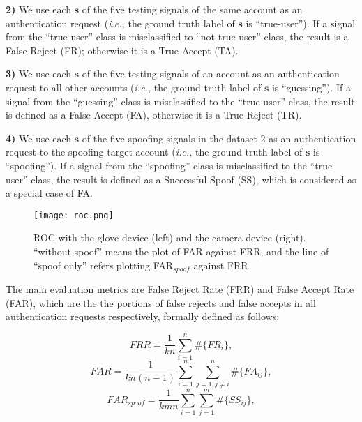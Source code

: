 \documentclass[conference]{IEEEtran}
\begin{document}
\textbf{2)} We use each $\mathbf{s}$ of the five testing signals of the same account as an authentication request (\textit{i.e.,} the ground truth label of $\mathbf{s}$ is ``true-user''). If a signal from the ``true-user'' class is misclassified to ``not-true-user'' class, the result is a False Reject (FR); otherwise it is a True Accept (TA). 

\textbf{3)} We use each $\mathbf{s}$ of the five testing signals of an account as an authentication request to all other accounts (\textit{i.e.,} the ground truth label of $\mathbf{s}$ is ``guessing''). If a signal from the ``guessing'' class is misclassified to the ``true-user'' class, the result is defined as a False Accept (FA), otherwise it is a True Reject (TR).

\textbf{4)} We use each $\mathbf{s}$ of the five spoofing signals in the dataset 2 as an authentication request to the spoofing target account (\textit{i.e.,} the ground truth label of $\mathbf{s}$ is ``spoofing''). If a signal from the ``spoofing'' class is misclassified to the ``true-user'' class, the result is defined as a Successful Spoof (SS), which is considered as a special case of FA. 




\begin{figure}[]
\begin{center}
\texttt{[image: roc.png]}
\end{center}
   \caption{ROC with the glove device (left) and the camera device (right). ``without spoof'' means the plot of FAR against FRR, and the line of ``spoof only'' refers plotting FAR$_{spoof}$ against FRR}
\label{fig:roc}
\end{figure}




The main evaluation metrics are False Reject Rate (FRR) and False Accept Rate (FAR), which are the the portions of false rejects and false accepts in all authentication requests respectively, formally defined as follows:

$$FRR = \frac{1}{kn}\sum\limits_{i=1}^{n} \#\{FR_i\},$$
$$FAR = \frac{1}{kn(n - 1)}\sum\limits_{i=1}^{n}\sum\limits_{j=1, j \ne i}^{n} \#\{FA_{ij}\},$$
$$FAR_{spoof} = \frac{1}{kmn}\sum\limits_{i=1}^{n}\sum\limits_{j=1}^{m} \#\{SS_{ij}\},$$
\end{document}
